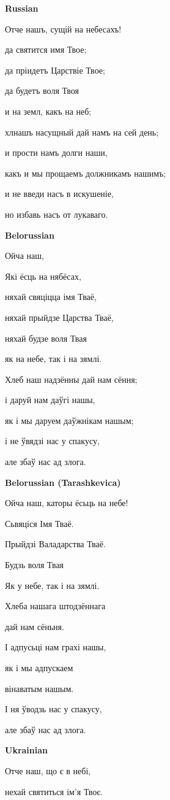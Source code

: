 \textbf{Russian}

Отче нашъ, сущій на небесахъ!

да святится имя Твое;

да пріидетъ Царствіе Твое;

да будетъ воля Твоя

и на земл\cyryat, какъ на неб\cyryat;

хл нашъ насущный дай намъ на сей день;

и прости намъ долги наши,

какъ и мы прощаемъ должникамъ нашимъ;

и не введи насъ в искушеніе,

но избавь насъ от лукаваго.

\textbf{Belorussian}

Ойча наш,

Які ёсць на нябёсах,

няхай свяціцца імя Тваё,

няхай прыйдзе Царства Тваё,

няхай будзе воля Твая

як на небе, так і на зямлі.

Хлеб наш надзённы дай нам сёння;

і даруй нам даўгі нашы,

як і мы даруем даўжнікам нашым;

і не ўвядзі нас у спакусу,

але збаў нас ад злога. 

\textbf{Belorussian (Tarashkevica)}

Ойча наш, каторы ёсьць на небе! 

Сьвяціся Імя Тваё. 

Прыйдзі Валадарства Тваё. 

Будзь воля Твая 

Як у небе, так і на зямлі. 

Хлеба нашага штодзённага 

дай нам сёньня. 

І адпусьці нам грахі нашы, 

як і мы адпускаем 

вінаватым нашым. 

І ня ўводзь нас у спакусу, 

але збаў нас ад злога. 

\textbf{Ukrainian}

Отче наш, що є в небі,
 
нехай святиться ім'я Твоє.

